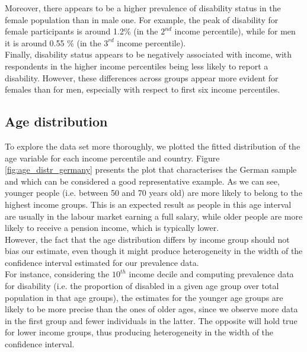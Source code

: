 Moreover, there appears to be a higher prevalence of disability status in the female population than in male one. For example, the peak of disability for female participants is around 1.2\% (in the $2^{nd}$ income percentile), while for men it is around 0.55 \% (in the $3^{rd}$ income percentile).\\

Finally, disability status appears to be negatively associated with income, with respondents in the higher income percentiles being less likely to report a disability. However, these differences across groups appear more evident for females than for men, especially with respect to first six income percentiles.


\subsection{Age distribution}

To explore the data set more thoroughly, we plotted the fitted distribution of the age variable for each income percentile and country. Figure \ref{fig:age_distr_germany} presents the plot that characterises the German sample and which can be considered a good representative example. As we can see, younger people (i.e. between 50 and 70 years old) are more likely to belong to the highest income groups. This is an expected result as people in this age interval are usually in the labour market earning a full salary, while older people are more likely to receive a pension income, which is typically lower.\\
However, the fact that the age distribution differs by income group should not bias our estimate, even though it might produce heterogeneity in the width of the confidence interval estimated for our prevalence data.  \\

For instance, considering the $10^{th}$ income decile and computing prevalence data for disability (i.e. the proportion of disabled in a given age group over total population in that age groups), the estimates for the younger age groups are likely to be more precise than the ones of older ages, since we observe more data in the first group and fewer individuals in the latter. The opposite will hold true for lower income groups, thus producing heterogeneity in the width of the confidence interval.



